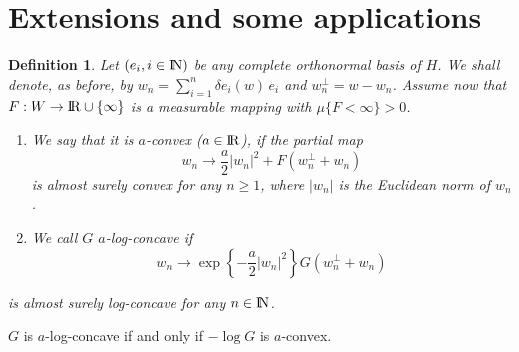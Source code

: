 \documentclass[12pt,a4paper]{book}
\newtheorem{definition}[theorem]{Definition}
\newcommand{\reals}{{\rm I\!R}}
\newcommand{\NN}{{\rm I\!N}}
\newcommand{\remark}{\noindent {\bf Remark:\ }}
\begin{document}

\section{Extensions and some applications}
\begin{definition}
Let $(e_i,i\in \NN)$ be any  complete orthonormal  basis of  $H$. We shall
denote, as before, by $w_n=\sum_{i=1}^n\delta e_i(w)\,e_i$ and
$w_n^\perp=w-w_n$.
Assume now that $F:W\to \reals\cup\{\infty\}$ is a measurable mapping with
$\mu\{F<\infty\}>0$.
\begin{enumerate}
\item We say that it is $a$-convex ($a\in \reals$), if the partial map
$$
w_n\to \frac{a}{2}|w_n|^2+F(w_n^\perp+w_n)
$$
is almost surely convex for any $n\geq 1$, where $|w_n|$ is the
Euclidean norm of $w_n$.
\item We call $G$ $a$-log-concave if
$$
w_n\to \exp\left\{-\frac{a}{2}|w_n|^2\right\}G(w_n^\perp+w_n)
$$
\end{enumerate}
is almost surely log-concave for any $n\in \NN$.
\end{definition}
\remark
$G$ is $a$-log-concave if and only if $-\log G$ is $a$-convex.
\newline
\end{document}
